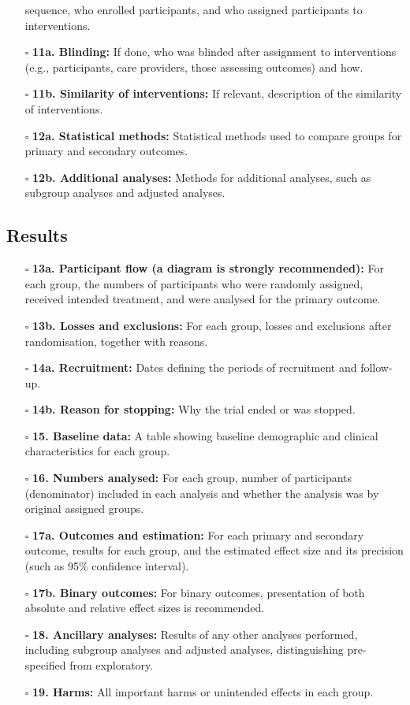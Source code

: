 \documentclass[11pt]{article}
\def\tightlist{}
\begin{document}
\begin{Form}
\begin{itemize}
  sequence, who enrolled participants, and who assigned participants to
  interventions.
\item[$\square$]
  \textbf{11a. Blinding:} If done, who was blinded after assignment to
  interventions (e.g., participants, care providers, those assessing
  outcomes) and how.
\item[$\square$]
  \textbf{11b. Similarity of interventions:} If relevant, description of
  the similarity of interventions.
\item[$\square$]
  \textbf{12a. Statistical methods:} Statistical methods used to compare
  groups for primary and secondary outcomes.
\item[$\square$]
  \textbf{12b. Additional analyses:} Methods for additional analyses,
  such as subgroup analyses and adjusted analyses.
\end{itemize}

\subsection{Results}\label{results}

\begin{itemize}
\tightlist
\item[$\square$]
  \textbf{13a. Participant flow (a diagram is strongly recommended):}
  For each group, the numbers of participants who were randomly
  assigned, received intended treatment, and were analysed for the
  primary outcome.
\item[$\square$]
  \textbf{13b. Losses and exclusions:} For each group, losses and
  exclusions after randomisation, together with reasons.
\item[$\square$]
  \textbf{14a. Recruitment:} Dates defining the periods of recruitment
  and follow-up.
\item[$\square$]
  \textbf{14b. Reason for stopping:} Why the trial ended or was stopped.
\item[$\square$]
  \textbf{15. Baseline data:} A table showing baseline demographic and
  clinical characteristics for each group.
\item[$\square$]
  \textbf{16. Numbers analysed:} For each group, number of participants
  (denominator) included in each analysis and whether the analysis was
  by original assigned groups.
\item[$\square$]
  \textbf{17a. Outcomes and estimation:} For each primary and secondary
  outcome, results for each group, and the estimated effect size and its
  precision (such as 95\% confidence interval).
\item[$\square$]
  \textbf{17b. Binary outcomes:} For binary outcomes, presentation of
  both absolute and relative effect sizes is recommended.
\item[$\square$]
  \textbf{18. Ancillary analyses:} Results of any other analyses
  performed, including subgroup analyses and adjusted analyses,
  distinguishing pre-specified from exploratory.
\item[$\square$]
  \textbf{19. Harms:} All important harms or unintended effects in each
  group.
\end{itemize}


\end{Form}
\end{document}
